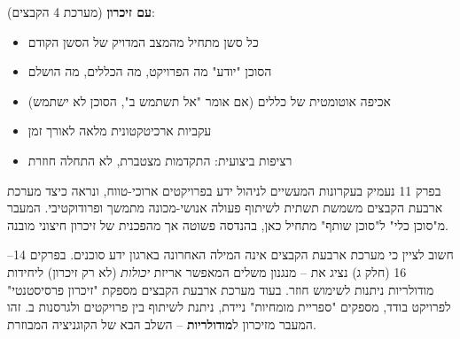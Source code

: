 \textbf{עם זיכרון} (מערכת \num{4} הקבצים):
\begin{itemize}
  \item כל סשן מתחיל מהמצב המדויק של הסשן הקודם
  \item הסוכן "יודע" מה הפרויקט, מה הכללים, מה הושלם
  \item אכיפה אוטומטית של כללים (אם  אומר "אל תשתמש ב", הסוכן לא ישתמש)
  \item עקביות ארכיטקטונית מלאה לאורך זמן
  \item רציפות ביצועית: התקדמות מצטברת, לא התחלה חוזרת
\end{itemize}

בפרק \num{11} נעמיק בעקרונות המעשיים לניהול ידע בפרויקטים ארוכי-טווח, ונראה כיצד מערכת ארבעת הקבצים משמשת תשתית לשיתוף פעולה אנושי-מכונה מתמשך ופרודוקטיבי. המעבר מ"סוכן כלי" ל"סוכן שותף" מתחיל כאן, בהנדסה פשוטה אך מהפכנית של זיכרון חיצוני מובנה.

חשוב לציין כי מערכת ארבעת הקבצים אינה המילה האחרונה בארגון ידע סוכנים. בפרקים \num{14}–\num{16} (חלק ג) נציג את \textbf{} – מנגנון משלים המאפשר אריזת \textit{יכולות} (לא רק זיכרון) ליחידות מודולריות ניתנות לשימוש חוזר. בעוד מערכת ארבעת הקבצים מספקת "זיכרון פרסיסטנטי" לפרויקט בודד,  מספקים "ספריית מומחיות" ניידת, ניתנת לשיתוף בין פרויקטים ולגרסנות ב. זהו המעבר מזיכרון ל\textbf{מודולריות} – השלב הבא של הקוגניציה המבוזרת.
